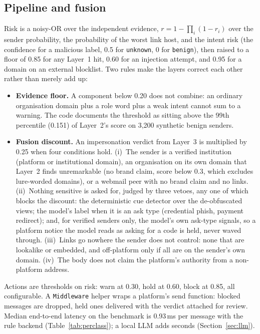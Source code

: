 \documentclass[10pt,twocolumn]{article}
\newcommand{\code}[1]{\texttt{#1}}
\begin{document}
\subsection{Pipeline and fusion}
\label{sec:pipeline}

Risk is a noisy-OR over the independent evidence, $r = 1-\prod_i(1-r_i)$ over the sender probability, the probability of the worst link host, and the intent risk (the confidence for a malicious label, 0.5 for \code{unknown}, 0 for \code{benign}), then raised to a floor of 0.85 for any Layer~1 hit, 0.60 for an injection attempt, and 0.95 for a domain on an external blocklist. Two rules make the layers correct each other rather than merely add up:
\begin{itemize}
\item \textbf{Evidence floor.} A component below 0.20 does not combine: an ordinary organisation domain plus a role word plus a weak intent cannot sum to a warning. The code documents the threshold as sitting above the 99th percentile (0.151) of Layer~2's score on 3{,}200 synthetic benign senders.
\item \textbf{Fusion discount.} An impersonation verdict from Layer~3 is multiplied by 0.25 when four conditions hold. (i)~The sender is a verified institution (platform or institutional domain), an organisation on its own domain that Layer~2 finds unremarkable (no brand claim, score below 0.3, which excludes lure-worded domains), or a webmail peer with no brand claim and no links. (ii)~Nothing sensitive is asked for, judged by three vetoes, any one of which blocks the discount: the deterministic cue detector over the de-obfuscated views; the model's label when it is an ask type (credential phish, payment redirect); and, for verified senders only, the model's own ask-type signals, so a platform notice the model reads as asking for a code is held, never waved through. (iii)~Links go nowhere the sender does not control: none that are lookalike or embedded, and off-platform only if all are on the sender's own domain. (iv)~The body does not claim the platform's authority from a non-platform address.
\end{itemize}
Actions are thresholds on risk: warn at 0.30, hold at 0.60, block at 0.85, all configurable. A \code{Middleware} helper wraps a platform's send function: blocked messages are dropped, held ones delivered with the verdict attached for review. Median end-to-end latency on the benchmark is 0.93\,ms per message with the rule backend (Table~\ref{tab:perclass}); a local LLM adds seconds (Section~\ref{sec:llm}).
\end{document}
